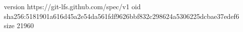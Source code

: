 version https://git-lfs.github.com/spec/v1
oid sha256:5181901a616d45a2e54da561fdf9626bbf832c298624a5306225dcbae37edef6
size 21960
